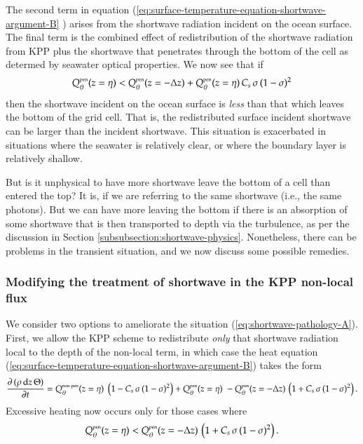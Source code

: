 The second term in equation
(\ref{eq:surface-temperature-equation-shortwave-argument-B} ) arises
from the shortwave radiation incident on the ocean surface.  The final
term is the combined effect of redistribution of the shortwave
radiation from KPP plus the shortwave that penetrates through the
bottom of the cell as determed by seawater optical properties.  We now
see that if
\begin{equation}
 Q_{\theta}^{\mbox{\tiny pen}}(z=\eta)  <    Q_{\theta}^{\mbox{\tiny pen}}(z=-\Delta z)  + 
 Q_{\theta}^{\mbox{\tiny pen}}(z=\eta)   \, C_{s} \, \sigma \, (1-\sigma)^{2} 
\label{eq:shortwave-pathology-A}
\end{equation}
then the shortwave incident on the ocean surface is {\it less} than
that which leaves the bottom of the grid cell. That is, the
redistributed surface incident shortwave can be larger than the
incident shortwave.  This situation is exacerbated in situations where
the seawater is relatively clear, or where the boundary layer is
relatively shallow.  

But is it unphysical to have more shortwave leave the bottom of a cell
than entered the top?  It is, if we are referring to the same
shortwave (i.e., the same photons).  But we can have more leaving the
bottom if there is an absorption of some shortwave that is then
transported to depth via the turbulence, as per the discussion in
Section \ref{subsubsection:shortwave-physics}.  Nonetheless, there can
be problems in the transient situation, and we now discuss some
possible remedies.


\subsubsection{Modifying the treatment of shortwave in the KPP non-local flux}

We consider two options to ameliorate the situation
(\ref{eq:shortwave-pathology-A}). First, we allow the KPP scheme to
redistribute {\it only} that shortwave radiation local to the depth of
the non-local term, in which case the heat equation
(\ref{eq:surface-temperature-equation-shortwave-argument-B}) takes the
form
\begin{equation}
 \frac{\partial \, (\rho \, \mathrm{d}z \, \Theta)}{\partial t} 
 =     Q_{\theta}^{\mbox{\tiny non-pen}}(z=\eta) \;     \left( 1 - C_{s} \, \sigma \, (1-\sigma)^{2} \right) 
    +  Q_{\theta}^{\mbox{\tiny pen}}(z=\eta) \;     
    - Q_{\theta}^{\mbox{\tiny pen}}(z=-\Delta z) \, \left( 1 +  C_{s} \, \sigma \, (1-\sigma)^{2} \right). 
\label{eq:surface-temperature-equation-shortwave-argument-C} 
\end{equation}
Excessive heating now occurs only for those cases where 
\begin{equation}
 Q_{\theta}^{\mbox{\tiny pen}}(z=\eta)  <    Q_{\theta}^{\mbox{\tiny pen}}(z=-\Delta z)  
\, \left( 1 +  C_{s} \, \sigma \, (1-\sigma)^{2} \right).
\label{eq:shortwave-pathology-B}
\end{equation}

